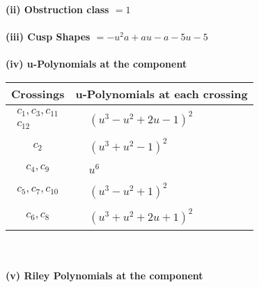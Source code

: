 \documentclass[1p]{elsarticle_modified}
\theoremstyle{definition}
\begin{document}
\flushleft \textbf{(ii) Obstruction class $= 1$}\\~\\
\flushleft \textbf{(iii) Cusp Shapes $= - u^2 a+a u- a-5 u-5$}\\~\\
\newpage\renewcommand{\arraystretch}{1}
\flushleft \textbf{(iv) u-Polynomials at the component}\newline \\
\begin{tabular}{m{50pt}|m{274pt}}
Crossings & \hspace{64pt}u-Polynomials at each crossing \\
\hline $$\begin{aligned}c_{1},c_{3},c_{11}\\c_{12}\end{aligned}$$&$\begin{aligned}
&(u^3- u^2+2 u-1)^2
\end{aligned}$\\
\hline $$\begin{aligned}c_{2}\end{aligned}$$&$\begin{aligned}
&(u^3+u^2-1)^2
\end{aligned}$\\
\hline $$\begin{aligned}c_{4},c_{9}\end{aligned}$$&$\begin{aligned}
&u^6
\end{aligned}$\\
\hline $$\begin{aligned}c_{5},c_{7},c_{10}\end{aligned}$$&$\begin{aligned}
&(u^3- u^2+1)^2
\end{aligned}$\\
\hline $$\begin{aligned}c_{6},c_{8}\end{aligned}$$&$\begin{aligned}
&(u^3+u^2+2 u+1)^2
\end{aligned}$\\
\hline
\end{tabular}\\~\\
\newpage\renewcommand{\arraystretch}{1}
\flushleft \textbf{(v) Riley Polynomials at the component}\newline \\
\end{document}
